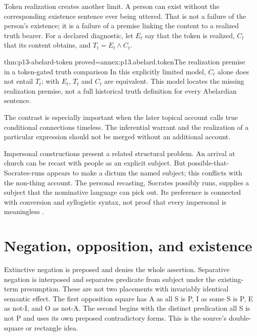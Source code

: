 Token realization creates another limit. A person can exist
without the corresponding existence sentence ever being uttered.
That is not a failure of the person's existence; it is a failure
of a premise linking the content to a realized truth bearer.
For a declared diagnostic, let \(E_t\) say that the token is
realized, \(C_t\) that its content obtains, and
\(T_t=E_t\land C_t\).

\begin{hblemma}{thm:p13-abelard-token}
 {proved=annex:p13.abelard.token}{The realization premise in a token-gated truth comparison}
In this explicitly limited model, \(C_t\) alone does not entail
\(T_t\); with \(E_t\), \(T_t\) and \(C_t\) are equivalent.
This model locates the missing realization premise, not a full
historical truth definition for every Abelardian sentence.
\end{hblemma}

The contrast is especially important when the later topical account
calls true conditional connections timeless. The inferential
warrant and the realization of a particular expression should
not be merged without an additional account.

Impersonal constructions present a related structural problem.
An arrival at church can be recast with people as an explicit
subject. But possible-that-Socrates-runs appears to make a dictum
the named subject; this conflicts with the non-thing account.
The personal recasting, Socrates possibly runs, supplies a
subject that the nominative language can pick out.
Its preference is connected with conversion and syllogistic
syntax, not proof that every impersonal is meaningless
\cite[pp.~102--108]{Wilks2007FordhamAbelard}.

\section{Negation, opposition, and existence}
\label{sec:p13-abelard-opposition}

Extinctive negation is preposed and denies the whole assertion.
Separative negation is interposed and separates predicate from
subject under the existing-term presumption.
These are not two placements with invariably identical semantic effect.
The first opposition square has A as all S is P, I as some S
is P, E as not-I, and O as not-A.
The second begins with the distinct predication all S is not P
and uses its own preposed contradictory forms.
This is the source's double-square or rectangle idea.

